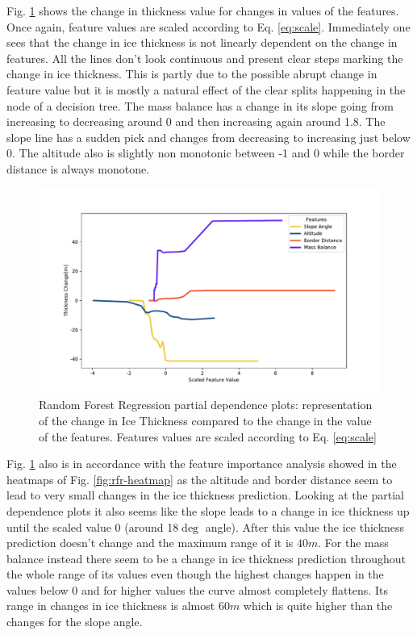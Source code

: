 Fig. \ref{fig:rfr-pdp} shows the change in thickness value for changes in values of the features. Once again, feature values are scaled according to Eq. \ref{eq:scale}. Immediately one sees that the change in ice thickness is not linearly dependent on the change in features. All the lines don't look continuous and present clear steps marking the change in ice thickness. This is partly due to the possible abrupt change in feature value but it is mostly a natural effect of the clear splits happening in the node of a decision tree.  The mass balance has a change in its slope going from increasing to decreasing around 0 and then increasing again around 1.8. The slope line has a sudden pick and changes from decreasing to increasing just below 0. The altitude also is slightly non monotonic between -1 and 0 while the border distance is always monotone. 
\begin{figure}[!tp]
	\centering		  
	\includegraphics[width=1.\textwidth]{figures/RFR_pdp.pdf}
	\caption{Random Forest Regression partial dependence plots: representation of the change in Ice Thickness compared to the change in the value of the features. Features values are scaled according to Eq. \ref{eq:scale}}
	\label{fig:rfr-pdp}
\end{figure}

Fig. \ref{fig:rfr-pdp} also is in accordance with the feature importance analysis showed in the heatmaps of Fig. \ref{fig:rfr-heatmap} as the altitude and border distance seem to lead to very small changes in the ice thickness prediction. Looking at the partial dependence plots it also seems like the slope leads to a change in ice thickness up until the scaled value 0 (around 18$\deg$ angle). After this value the ice thickness prediction doesn't change and the maximum range of it is $40m$. For the mass balance instead there seem to be a change in ice thickness prediction throughout the whole range of its values even though the highest changes happen in the values below 0 and for higher values the curve almost completely flattens. Its range in changes in ice thickness is almost $60m$ which is quite higher than the changes for the slope angle.


